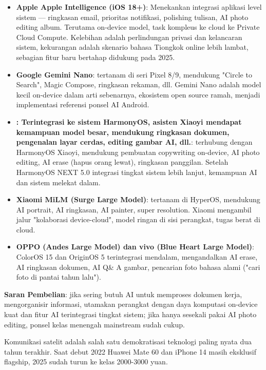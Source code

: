 \begin{itemize}
  \item \textbf{Apple Apple Intelligence (iOS 18+)}: Menekankan integrasi aplikasi level sistem — ringkasan email, prioritas notifikasi, polishing tulisan, AI photo editing album. Terutama on-device model, task kompleus ke cloud ke Private Cloud Compute. Kelebihan adalah perlindungan privasi dan kelancaran sistem, kekurangan adalah skenario bahasa Tiongkok online lebih lambat, sebagian fitur baru bertahap didukung pada 2025.
  \item \textbf{Google Gemini Nano}: tertanam di seri Pixel 8/9, mendukung "Circle to Search", Magic Compose, ringkasan rekaman, dll. Gemini Nano adalah model kecil on-device dalam arti sebenarnya, ekosistem open source ramah, menjadi implementasi referensi ponsel AI Android.
  \item \textbf{: Terintegrasi ke sistem HarmonyOS, asisten Xiaoyi mendapat kemampuan model besar, mendukung ringkasan dokumen, pengenalan layar cerdas, editing gambar AI, dll.}: terhubung dengan HarmonyOS Xiaoyi, mendukung pembuatan copywriting on-device, AI photo editing, AI erase (hapus orang lewat), ringkasan panggilan. Setelah HarmonyOS NEXT 5.0 integrasi tingkat sistem lebih lanjut, kemampuan AI dan sistem melekat dalam.
  \item \textbf{Xiaomi MiLM (Surge Large Model)}: tertanam di HyperOS, mendukung AI portrait, AI ringkasan, AI painter, super resolution. Xiaomi mengambil jalur "kolaborasi device-cloud", model ringan di sisi perangkat, tugas berat di cloud.
  \item \textbf{OPPO (Andes Large Model) dan vivo (Blue Heart Large Model)}: ColorOS 15 dan OriginOS 5 terintegrasi mendalam, mengandalkan AI erase, AI ringkasan dokumen, AI Q\& A gambar, pencarian foto bahasa alami ("cari foto di pantai tahun lalu").
\end{itemize}

\textbf{Saran Pembelian}: jika sering butuh AI untuk memproses dokumen kerja, mengorganisir informasi, utamakan perangkat dengan daya komputasi on-device kuat dan fitur AI terintegrasi tingkat sistem; jika hanya sesekali pakai AI photo editing, ponsel kelas menengah mainstream sudah cukup.


Komunikasi satelit adalah salah satu demokratisasi teknologi paling nyata dua tahun terakhir. Saat debut 2022 Huawei Mate 60 dan iPhone 14 masih eksklusif flagship, 2025 sudah turun ke kelas 2000-3000 yuan.

